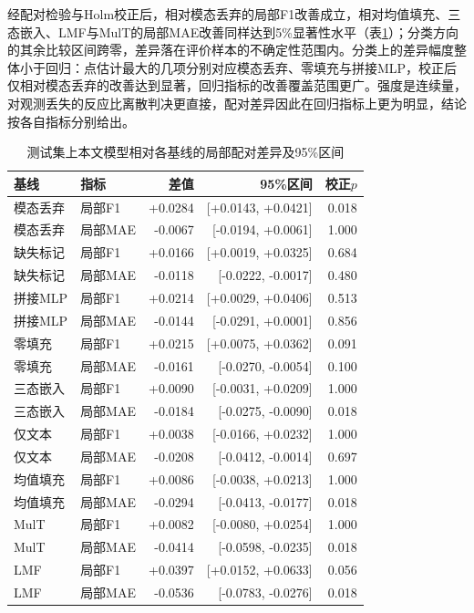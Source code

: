 经配对检验与Holm校正后，相对模态丢弃的局部F1改善成立，相对均值填充、三态嵌入、LMF与MulT的局部MAE改善同样达到5\%显著性水平（表\ref{q2:tab:paired}）；分类方向的其余比较区间跨零，差异落在评价样本的不确定性范围内。分类上的差异幅度整体小于回归：点估计最大的几项分别对应模态丢弃、零填充与拼接MLP，校正后仅相对模态丢弃的改善达到显著，回归指标的改善覆盖范围更广。强度是连续量，对观测丢失的反应比离散判决更直接，配对差异因此在回归指标上更为明显，结论按各自指标分别给出。

\begin{table}[htbp]\centering\small
\caption{测试集上本文模型相对各基线的局部配对差异及95\%区间}\label{q2:tab:paired}
\begin{tabular}{llrrr}\toprule
基线 & 指标 & 差值 & 95\%区间 & 校正$p$\\\midrule
模态丢弃 & 局部F1 & +0.0284 & [+0.0143, +0.0421] & 0.018\\
模态丢弃 & 局部MAE & -0.0067 & [-0.0194, +0.0061] & 1.000\\
缺失标记 & 局部F1 & +0.0166 & [+0.0019, +0.0325] & 0.684\\
缺失标记 & 局部MAE & -0.0118 & [-0.0222, -0.0017] & 0.480\\
拼接MLP & 局部F1 & +0.0214 & [+0.0029, +0.0406] & 0.513\\
拼接MLP & 局部MAE & -0.0144 & [-0.0291, +0.0001] & 0.856\\
零填充 & 局部F1 & +0.0215 & [+0.0075, +0.0362] & 0.091\\
零填充 & 局部MAE & -0.0161 & [-0.0270, -0.0054] & 0.100\\
三态嵌入 & 局部F1 & +0.0090 & [-0.0031, +0.0209] & 1.000\\
三态嵌入 & 局部MAE & -0.0184 & [-0.0275, -0.0090] & 0.018\\
仅文本 & 局部F1 & +0.0038 & [-0.0166, +0.0232] & 1.000\\
仅文本 & 局部MAE & -0.0208 & [-0.0412, -0.0014] & 0.697\\
均值填充 & 局部F1 & +0.0086 & [-0.0038, +0.0213] & 1.000\\
均值填充 & 局部MAE & -0.0294 & [-0.0413, -0.0177] & 0.018\\
MulT & 局部F1 & +0.0082 & [-0.0080, +0.0254] & 1.000\\
MulT & 局部MAE & -0.0414 & [-0.0598, -0.0235] & 0.018\\
LMF & 局部F1 & +0.0397 & [+0.0152, +0.0633] & 0.056\\
LMF & 局部MAE & -0.0536 & [-0.0783, -0.0276] & 0.018\\
\bottomrule\end{tabular}\end{table}

